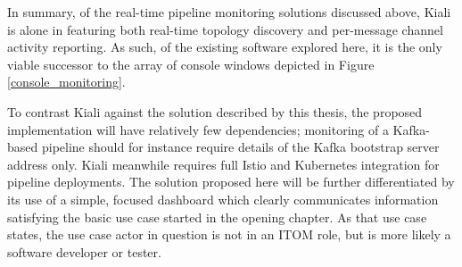 In summary, of the real-time pipeline monitoring solutions discussed above, Kiali is alone in featuring both real-time topology discovery and per-message channel activity reporting. As such, of the existing software explored here, it is the only viable successor to the array of console windows depicted in Figure \ref{console_monitoring}.

To contrast Kiali against the solution described by this thesis, the proposed implementation will have relatively few dependencies; monitoring of a Kafka-based pipeline should for instance require details of the Kafka bootstrap server address only. Kiali meanwhile requires full Istio and Kubernetes integration for pipeline deployments. The solution proposed here will be further differentiated by its use of a simple, focused dashboard which clearly communicates information satisfying the basic use case started in the opening chapter. As that use case states, the use case actor in question is not in an ITOM role, but is more likely a software developer or tester. 
